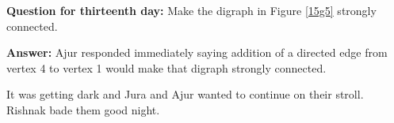\textbf{Question for thirteenth day:} Make the digraph in Figure \ref{15g5} strongly connected. 

\textbf{Answer:} Ajur responded immediately saying  addition of a directed edge from vertex 4 to vertex 1 would make that digraph strongly connected.

It was getting dark and Jura and Ajur wanted to continue on their stroll. Rishnak bade them good night.
